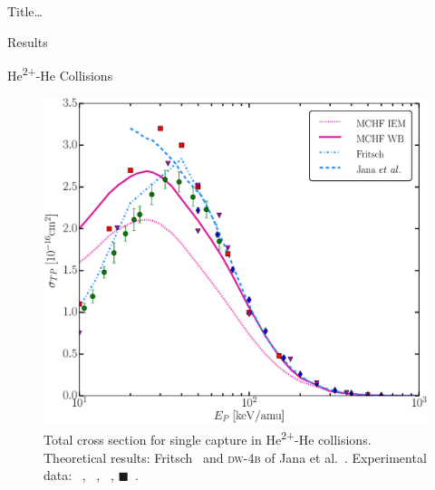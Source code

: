 \documentclass[letterpaper, 10 pt]{report}
\begin{document}
\begin{chapter}{ Title\dots \label{chap:p-he2p-he}}
\begin{section}{Results \label{sec:phe2p-res}}
\begin{subsection}{\texorpdfstring{He\textsuperscript{2+}}{He2+}-He Collisions 
                         \label{sec:he2phe-res}}
\begin{figure}[ht]
\begin{minipage}{.49\linewidth}
               \centering
               \includegraphics[width = \linewidth]{./images/he2phe/he2phe-TP.eps}
               \caption[Total cross section for single capture in He\textsuperscript{2+}-He
                        collisions.]{Total cross section for single capture in He\textsuperscript{2+}-He
                        collisions. Theoretical results: Fritsch~\cite{Fritsch-94} and \textsc{dw-4b} of
                        Jana et al.~\cite{JMP-15}.
                        Experimental data: {\color{blue}{$\blacklozenge$}}~\cite{SG85},
                        {\color{OliveGreen}{$\bullet$}}~\cite{SG89},
                        {\color{RedViolet}{$\blacktriangledown$}}~\cite{Dubois87},
                        {\color{red}$\blacksquare$}~\cite{Rudd85}. \label{fig:he2phe-tp}}
            \end{minipage}
         \end{figure}
 

\end{subsection}
\end{section}
\end{chapter}
\end{document}

